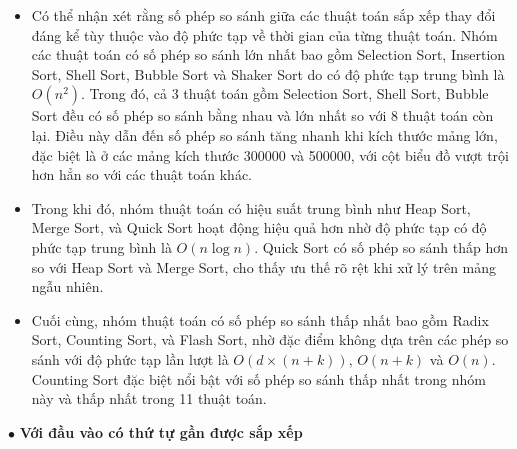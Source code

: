 \begin{itemize}[label=$\circ$]
    \item Có thể nhận xét rằng số phép so sánh giữa các thuật toán sắp 
    xếp thay đổi đáng kể tùy thuộc vào độ phức tạp về thời gian của từng 
    thuật toán. Nhóm các thuật toán có số phép so sánh lớn nhất bao gồm 
    Selection Sort, Insertion Sort, Shell Sort, Bubble Sort và Shaker 
    Sort do có độ phức tạp trung bình là $O\left(n^2\right)$. Trong đó, 
    cả 3 thuật toán gồm Selection Sort, Shell Sort, Bubble Sort đều có 
    số phép so sánh bằng nhau và lớn nhất so với 8 thuật toán còn lại. 
    Điều này dẫn đến số phép so sánh tăng nhanh khi kích thước mảng lớn, 
    đặc biệt là ở các mảng kích thước 300000 và 500000, với cột biểu đồ 
    vượt trội hơn hẳn so với các thuật toán khác.
	\item Trong khi đó, nhóm thuật toán có hiệu suất trung bình như Heap 
    Sort, Merge Sort, và Quick Sort hoạt động hiệu quả hơn nhờ độ phức 
    tạp có độ phức tạp trung bình là $O\left(n\log{n}\right)$. Quick Sort 
    có số phép so sánh thấp hơn so với Heap Sort và Merge Sort, cho thấy 
    ưu thế rõ rệt khi xử lý trên mảng ngẫu nhiên.
	\item Cuối cùng, nhóm thuật toán có số phép so sánh thấp nhất bao 
    gồm Radix Sort, Counting Sort, và Flash Sort, nhờ đặc điểm không dựa 
    trên các phép so sánh với độ phức tạp lần lượt là $O(d \times (n + k))$, 
    $O(n + k)$ và $O\left(n\right)$. Counting Sort đặc biệt nổi bật với 
    số phép so sánh thấp nhất trong nhóm này và thấp nhất trong 11 thuật 
    toán.
\end{itemize}

$\bullet$ \textbf{Với đầu vào có thứ tự gần được sắp xếp}

